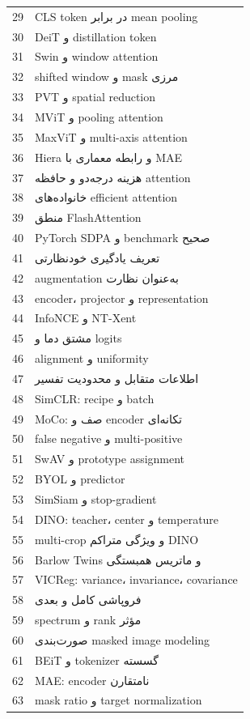 \documentclass[12pt,openany,oneside]{book}
\begin{document}
\begin{videobox}
\begin{longtable}{p{12mm}p{122mm}}
29 & CLS token در برابر mean pooling \\
30 & DeiT و distillation token \\
31 & Swin و window attention \\
32 & shifted window و mask مرزی \\
33 & PVT و spatial reduction \\
34 & MViT و pooling attention \\
35 & MaxViT و multi-axis attention \\
36 & Hiera و رابطه معماری با MAE \\
37 & هزینه درجه‌دو و حافظه attention \\
38 & خانواده‌های efficient attention \\
39 & منطق FlashAttention \\
40 & PyTorch SDPA و benchmark صحیح \\
41 & تعریف یادگیری خودنظارتی \\
42 & augmentation به‌عنوان نظارت \\
43 & encoder، projector و representation \\
44 & InfoNCE و NT-Xent \\
45 & مشتق دما و logits \\
46 & alignment و uniformity \\
47 & اطلاعات متقابل و محدودیت تفسیر \\
48 & SimCLR: recipe و batch \\
49 & MoCo: صف و encoder تکانه‌ای \\
50 & false negative و multi-positive \\
51 & SwAV و prototype assignment \\
52 & BYOL و predictor \\
53 & SimSiam و stop-gradient \\
54 & DINO: teacher، center و temperature \\
55 & multi-crop و ویژگی متراکم DINO \\
56 & Barlow Twins و ماتریس همبستگی \\
57 & VICReg: variance، invariance، covariance \\
58 & فروپاشی کامل و بعدی \\
59 & spectrum و rank مؤثر \\
60 & صورت‌بندی masked image modeling \\
61 & BEiT و tokenizer گسسته \\
62 & MAE: encoder نامتقارن \\
63 & mask ratio و target normalization \\

\end{longtable}
\end{videobox}
\end{document}
